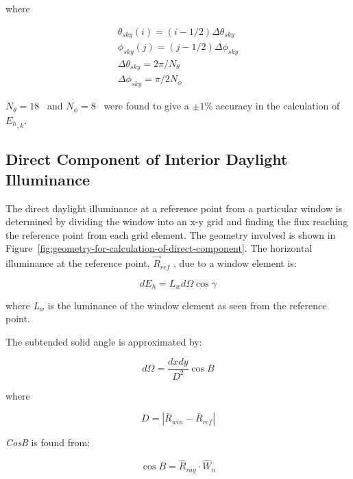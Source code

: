 where

\begin{equation}
\begin{array}{l}
    \theta_{sky}(i) = (i - 1/2) \Delta \theta_{sky} \\
    \phi_{sky}(j) = (j - 1/2) \Delta \phi_{sky} \\
    \Delta \theta_{sky} = 2 \pi / N_{\theta} \\
    \Delta \phi_{sky} = \pi / 2N_{\phi}
\end{array}
\end{equation}

\({N_\theta } = 18\) ~and \({N_\phi } = 8\) ~were found to give a \(\pm 1\%\) accuracy in the calculation of \({E_h}_{,k}\).

\subsection{Direct Component of Interior Daylight Illuminance}\label{direct-component-of-interior-daylight-illuminance}

The direct daylight illuminance at a reference point from a particular window is determined by dividing the window into an x-y grid and finding the flux reaching the reference point from each grid element. The geometry involved is shown in Figure~\ref{fig:geometry-for-calculation-of-direct-component}. The horizontal illuminance at the reference point, \({\vec R_{ref}}\) , due to a window element is:

\begin{equation}
d{E_h} = {L_w}d\Omega \cos \gamma
\end{equation}

where \emph{L\(_{w}\)} is the luminance of the window element as seen from the reference point.

The subtended solid angle is approximated by:

\begin{equation}
d\Omega  = \frac{{dxdy}}{{{D^2}}}\cos {B}
\label{eq:SubtendedSolidAngle}
\end{equation}

where

\begin{equation}
D = \left| {{{\bar R}_{win}} - {{\bar R}_{ref}}} \right|
\end{equation}

\emph{CosB} is found from:

\begin{equation}
\cos B = {\hat R_{ray}} \cdot {\hat W_n}
\end{equation}

